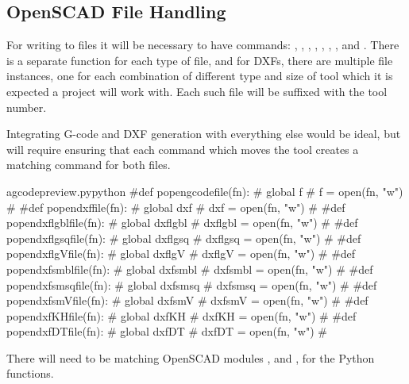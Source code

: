 \documentclass{ltxdoc}
\begin{document}
\begin{samepage}
\subsection{OpenSCAD File Handling}
 
For writing to files it will be necessary to have commands: 
, 
, 
, 
, 
, 
,  
, and 
.
There is a separate function for each type of file, and for DXFs, there are multiple file instances, one for each combination of different type and size of tool which it is expected a project will work with. Each such file will be suffixed with the tool number.

Integrating G-code and DXF generation with everything else would be ideal, but will require ensuring that each command which moves the tool creates a matching command for both files.

\lstset{firstnumber=\thegcpy}
\begin{writecode}{a}{gcodepreview.py}{python}
#def popengcodefile(fn):
#    global f
#    f = open(fn, "w")
#
#def popendxffile(fn):
#    global dxf
#    dxf = open(fn, "w")
#
#def popendxflgblfile(fn):
#    global dxflgbl
#    dxflgbl = open(fn, "w")
#
#def popendxflgsqfile(fn):
#    global dxflgsq
#    dxflgsq = open(fn, "w")
#
#def popendxflgVfile(fn):
#    global dxflgV
#    dxflgV = open(fn, "w")
#
#def popendxfsmblfile(fn):
#    global dxfsmbl
#    dxfsmbl = open(fn, "w")
#
#def popendxfsmsqfile(fn):
#    global dxfsmsq
#    dxfsmsq = open(fn, "w")
#
#def popendxfsmVfile(fn):
#    global dxfsmV
#    dxfsmV = open(fn, "w")
#
#def popendxfKHfile(fn):
#    global dxfKH
#    dxfKH = open(fn, "w")
#
#def popendxfDTfile(fn):
#    global dxfDT
#    dxfDT = open(fn, "w")
#
\end{writecode}
\addtocounter{gcpy}{40}
\end{samepage}

There will need to be matching OpenSCAD modules 
, and
, 
for the Python functions.
\end{document}
